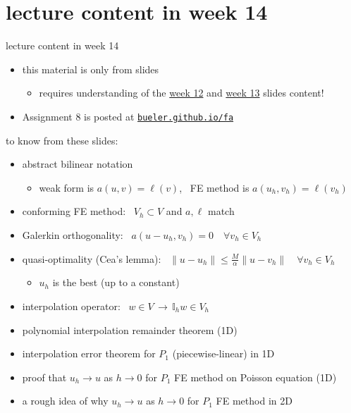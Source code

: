 \documentclass[10pt,
               svgnames,
               hyperref={colorlinks,
                         citecolor=DeepPink4,
                         linkcolor=FireBrick,
                         urlcolor=blue},
               usepdftitle=false]{beamer}
\newcommand{\II}{\mathbb{I}}
\begin{document}
\section{lecture content in week 14}

\begin{frame}{lecture content in week 14}

\begin{itemize}
\item this material is only from slides
    \begin{itemize}
    \item[$\circ$] requires understanding of the \href{https://bueler.github.io/fa/assets/slides/S26/week12.pdf}{week 12} and \href{https://bueler.github.io/fa/assets/slides/S26/week13.pdf}{week 13} slides content!
    \end{itemize}
\item Assignment 8 is posted at \quad  \href{https://bueler.github.io/fa/index.html}{\texttt{bueler.github.io/fa}}
\end{itemize}

\begin{block}{to know from these slides:}
\begin{itemize}
\item abstract bilinear notation
    \begin{itemize}
    \item[$\circ$] weak form is $a(u,v)=\ell(v)$, \, FE method is $a(u_h,v_h)=\ell(v_h)$
    \end{itemize}
\item conforming FE method: \, $V_h \subset V$ and $a,\ell$ match
\item Galerkin orthogonality: \, $a(u-u_h,v_h)=0 \quad \forall v_h\in V_h$
\item quasi-optimality (Cea's lemma): \, $\|u-u_h\| \le \frac{M}{\alpha} \|u-v_h\| \quad \forall v_h \in V_h$
    \begin{itemize}
    \item[$\circ$] \alert{$u_h$ is the best} (up to a constant)
    \end{itemize}
\item interpolation operator: \, $w\in V \, \to \, \II_h w \in V_h$
\item polynomial interpolation remainder theorem (1D)
\item interpolation error theorem for $P_1$ (piecewise-linear) in 1D
\item proof that $u_h\to u$ as $h\to 0$ for $P_1$ FE method on Poisson equation (1D)
\item a \alert{rough idea} of why $u_h \to u$ as $h\to 0$ for $P_1$ FE method \alert{in 2D}
\end{itemize}
\end{block}

\end{frame}
\end{document}
